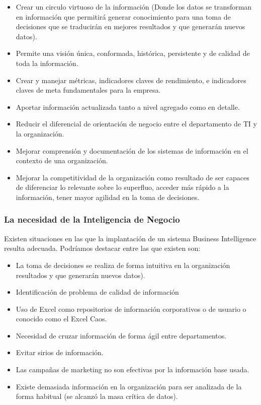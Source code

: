 \documentclass[preprint,12pt]{elsarticle}
\begin{document}
	\begin{itemize}
	\item Crear un circulo virtuoso de la información (Donde los datos se transforman en información que permitirá 
		generar conocimiento para una toma de decisiones que se traducirán en mejores resultados y que 
		generarán nuevos datos).
	\item Permite una visión única, conformada, histórica, persistente y de calidad de toda la información. 
	\item Crear y manejar métricas, indicadores claves de rendimiento, e indicadores claves de meta fundamentales 
		para la empresa.
	\item Aportar información actualizada tanto a nivel agregado como en detalle.
	\item Reducir el diferencial de orientación de negocio entre el departamento de TI y la organización. 
	\item Mejorar comprensión y documentación de los sistemas de información en el contexto de una organización.
	\item Mejorar la competitividad de la organización como resultado de ser capaces de diferenciar lo relevante sobre 
		lo superfluo, acceder más rápido a la información, tener mayor agilidad en la toma de decisiones.
	\end{itemize}\cite{referenciarobles3}
	\subsubsection{\textbf{La necesidad de la Inteligencia de Negocio}}
	Existen situaciones en las que la implantación de un sistema Business Intelligence  resulta adecuada. Podríamos destacar 
	entre las que existen son:

	\begin{itemize}
	\item La toma de decisiones se realiza de forma intuitiva en la organización resultados y que generarán nuevos datos).
	\item Identificación de problema de calidad de información
	\item Uso de Excel como repositorios de información corporativos o de usuario o conocido como el Excel Caos.
	\item Necesidad de cruzar información de forma ágil entre departamentos.
	\item Evitar sirios de información.
	\item Las campañas de marketing no son efectivas por la información base usada. 
	\item Existe demasiada información en la organización para ser analizada de la forma habitual (se alcanzó la masa crítica de datos).
	\end{itemize}
\end{document}
